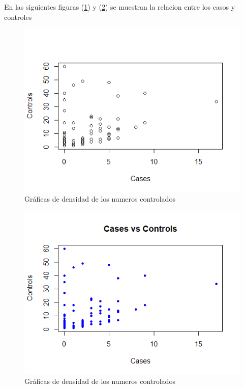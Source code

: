 \documentclass[12pt,a4paper]{article}
\begin{document}
En las siguientes figuras (\ref{fig:scapl1}) y (\ref{fig:scapl2}) se muestran la relacion entre los casos y controles 
\begin{figure}
	\centering
	\includegraphics[scale = 0.65]{scapl1.png}
	\caption{Gráficas de densidad de los numeros controlados} \label{fig:scapl1}
\end{figure}
\begin{figure}
	\centering
	\includegraphics[scale = 0.65]{scalp2.png}
	\caption{Gráficas de densidad de los numeros controlados} \label{fig:scapl2}
\end{figure}



\end{document}

